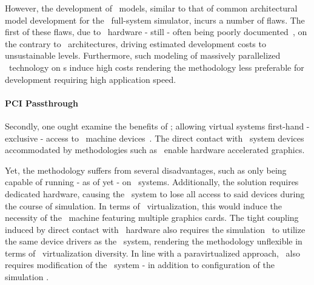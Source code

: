 However, the development of \dvttermgpu\ models, similar to that of common architectural model development for the \dvttermsimics\ full-system simulator, incurs a number of flaws.
The first of these flaws, due to \dvttermgpu\ hardware - still - often being poorly documented~, on the contrary to \dvttermcpu\ architectures, driving estimated development costs to unsustainable levels.
Furthermore, such modeling of massively parallelized \dvttermgpu\ technology on \dvttermcpu s induce high costs rendering the methodology less preferable for development requiring high application speed.

\paragraph{PCI Passthrough}
\label{par:background_graphicsvirtualization_pcipassthrough}
Secondly, one ought examine the benefits of \dvttermpcipassthrough ; allowing virtual systems first-hand - exclusive - access to \dvttermhost\ machine devices~.
The direct contact with \dvttermhost\ system devices accommodated by methodologies such as \dvttermpcipassthrough\ enable hardware accelerated graphics.

Yet, the methodology suffers from several disadvantages, such as only being capable of running - as of yet - on \dvttermlinux\ systems. %
Additionally, the solution requires dedicated hardware, causing the \dvttermhost\ system to lose all access to said devices during the course of simulation.
In terms of \dvttermgpu\ virtualization, this would induce the necessity of the \dvttermhost\ machine featuring multiple graphics cards.
The tight coupling induced by direct contact with \dvttermhost\ hardware also requires the simulation \dvttermtarget\ to utilize the same device drivers as the \dvttermhost\ system, rendering the methodology unflexible in terms of \dvttermgpu\ virtualization diversity.
In line with a paravirtualized approach, \dvttermpcipassthrough\ also requires modification of the \dvttermtarget\ system - in addition to configuration of the simulation \dvttermhost .


